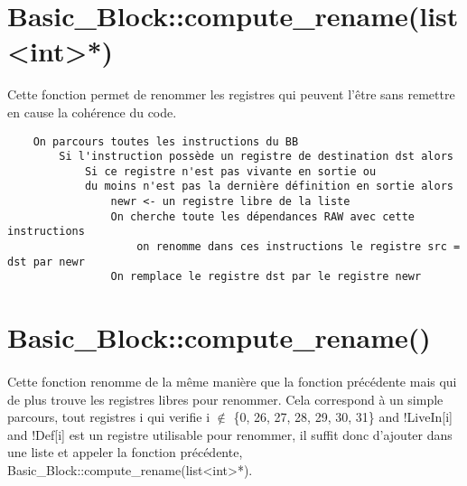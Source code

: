 \documentclass[a4paper,12pt]{report}
\begin{document}
\section{Basic\_Block::compute\_rename(list<int>*)}
Cette fonction permet de renommer les registres qui peuvent l'être sans remettre en cause la cohérence du code.

\begin{verbatim}
    On parcours toutes les instructions du BB
        Si l'instruction possède un registre de destination dst alors
            Si ce registre n'est pas vivante en sortie ou
            du moins n'est pas la dernière définition en sortie alors
                newr <- un registre libre de la liste
                On cherche toute les dépendances RAW avec cette instructions
                    on renomme dans ces instructions le registre src = dst par newr
                On remplace le registre dst par le registre newr
\end{verbatim}

\section{Basic\_Block::compute\_rename()}
\paragraph*{}
Cette fonction renomme de la même manière que la fonction précédente mais qui de plus trouve les registres libres pour renommer.
Cela correspond à un simple parcours, tout registres i qui verifie i $\notin$ \{0, 26, 27, 28, 29, 30, 31\} and !LiveIn[i] and !Def[i] est un registre utilisable pour renommer, il suffit donc d'ajouter dans une liste et appeler la fonction précédente, Basic\_Block::compute\_rename(list<int>*).
\end{document}
